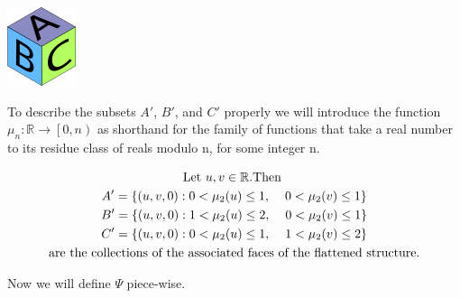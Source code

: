 \documentclass[]{article}
\begin{document}
\includegraphics[]{label.png}\centering

To describe the subsets $A'$, $B'$, and $C'$ properly we will introduce the function $\mu_{n}:\mathbb{R}\rightarrow \left[0,n\right) $ as shorthand for the family of functions that take a real number to its residue class of reals modulo n, for some integer n.

\begin{gather*}
	\text{Let }u,v\in\mathbb{R}. \text{Then }
	\\A'= \{(u,v,0): 0<\mu_{2}(u)\leq 1 ,\hspace{4mm} 0<\mu_{2}(v)\leq 1\}
	\\B'= \{(u,v,0): 1<\mu_{2}(u)\leq 2,\hspace{4mm} 0<\mu_{2}(v)\leq 1\}
	\\C'= \{(u,v,0): 0<\mu_{2}(u)\leq 1,\hspace{4mm} 1<\mu_{2}(v)\leq 2\}
	\\\text{are the collections of the associated faces of the flattened structure.}
\end{gather*}



Now we will define $\Psi$ piece-wise.
\end{document}
